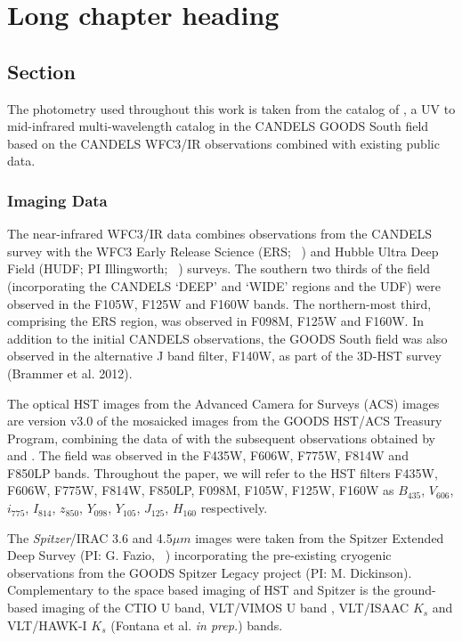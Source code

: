 
\chapter[Data]{Long chapter heading} 
\label{ch:chapter2_label}

\section[Sec]{Section}
\label{sec:section2_label}

The photometry used throughout this work is taken from the catalog of \citet{Guo:2013ig}, a UV to mid-infrared multi-wavelength catalog in the CANDELS GOODS South field based on the CANDELS WFC3/IR observations combined with existing public data.

\subsection{Imaging Data}
The near-infrared WFC3/IR data combines observations from the CANDELS survey \citep{2011ApJS..197...35G,Koekemoer:2011br} with the WFC3 Early Release Science (ERS; \citeauthor{2011ApJS..193...27W}~\citeyear{2011ApJS..193...27W}) and Hubble Ultra Deep Field (HUDF; PI Illingworth; \citeauthor{Bouwens:2010dk}~\citeyear{Bouwens:2010dk}) surveys. The southern two thirds of the field (incorporating the CANDELS `DEEP' and `WIDE' regions and the UDF) were observed in the F105W, F125W and F160W bands. The northern-most third, comprising the ERS region, was observed in F098M, F125W and F160W. In addition to the initial CANDELS observations, the GOODS South field was also observed in the alternative J band filter, F140W, as part of the 3D-HST survey (Brammer et al. 2012).

The optical HST images from the Advanced Camera for Surveys (ACS) images are version v3.0 of the mosaicked images from the GOODS HST/ACS Treasury Program, combining the data of \citet{2004ApJ...600L..93G} with the subsequent observations obtained by \citet{2006AJ....132.1729B} and \citep{Koekemoer:2011br}. The field was observed in the F435W, F606W, F775W, F814W and F850LP bands. Throughout the paper, we will refer to the HST filters F435W, F606W, F775W, F814W, F850LP, F098M, F105W, F125W, F160W as $B_{435}$, $V_{606}$, $i_{775}$, $I_{814}$, $z_{850}$, $Y_{098}$, $Y_{105}$, $J_{125}$, $H_{160}$ respectively. 

The \emph{Spitzer}/IRAC \citep{Fazio:2004eb} 3.6 and 4.5$\mu m$ images were taken from the Spitzer Extended Deep Survey (PI: G. Fazio, \citeauthor{Ashby:2013cc}~\citeyear{Ashby:2013cc}) incorporating the pre-existing cryogenic observations from the GOODS Spitzer Legacy project (PI: M. Dickinson). Complementary to the space based imaging of HST and Spitzer is the ground-based imaging of the CTIO U band, VLT/VIMOS U band \citep{Nonino:2009hf}, VLT/ISAAC $K_{s}$ \citep{Retzlaff:2010co} and VLT/HAWK-I $K_{s}$ (Fontana et al. \emph{in prep.}) bands.

